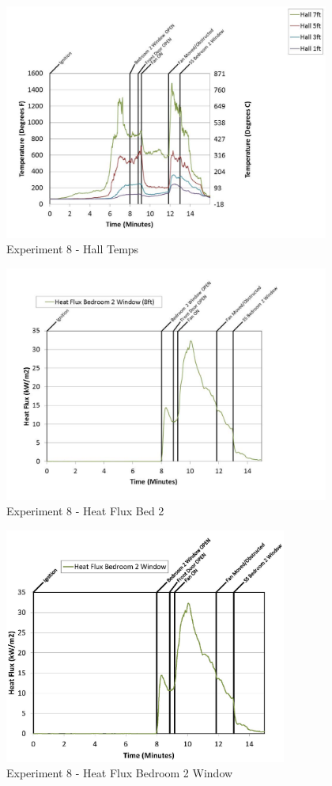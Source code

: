 \documentclass{article}
\begin{document}
\begin{appendices}
	\begin{figure}[h!]
		\centering
		\includegraphics[height=3.05in]{0_Images/Results_Charts/Exp_8_Charts/HallTemps.pdf}
		\caption{Experiment 8 - Hall Temps}
	\end{figure}
 
	\clearpage

	\begin{figure}[h!]
		\centering
		\includegraphics[height=3.05in]{0_Images/Results_Charts/Exp_8_Charts/HeatFluxBed2.pdf}
		\caption{Experiment 8 - Heat Flux Bed 2}
	\end{figure}
 

	\begin{figure}[h!]
		\centering
		\includegraphics[height=3.05in]{0_Images/Results_Charts/Exp_8_Charts/HeatFluxBedroom2Window.pdf}
		\caption{Experiment 8 - Heat Flux Bedroom 2 Window}
	\end{figure}
 

\end{appendices}
\end{document}
